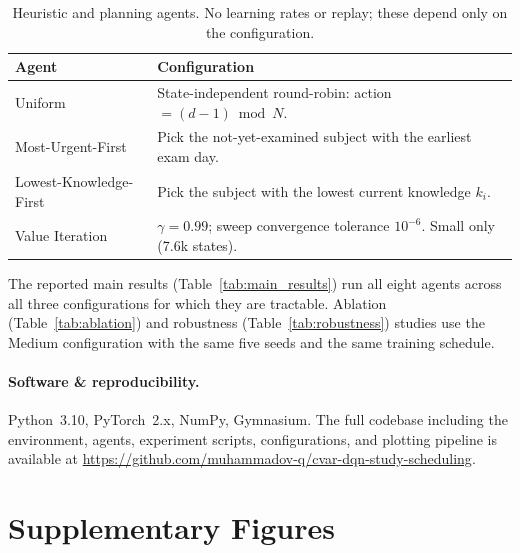 \documentclass[a4paper,11pt]{article}
\theoremstyle{definition}
\begin{document}
\begin{table}[H]
\centering
\caption{Heuristic and planning agents. No learning rates or replay; these depend only on the configuration.}
\label{tab:nonlearn_hp}
\small
\begin{tabular}{ll}
\toprule
Agent & Configuration \\
\midrule
Uniform                & State-independent round-robin: action $= (d - 1) \bmod N$. \\
Most-Urgent-First      & Pick the not-yet-examined subject with the earliest exam day. \\
Lowest-Knowledge-First & Pick the subject with the lowest current knowledge $k_i$. \\
Value Iteration        & $\gamma = 0.99$; sweep convergence tolerance $10^{-6}$. Small only (7.6k states). \\
\bottomrule
\end{tabular}
\end{table}

The reported main results (Table~\ref{tab:main_results}) run all eight agents across all three configurations for which they are tractable. Ablation (Table~\ref{tab:ablation}) and robustness (Table~\ref{tab:robustness}) studies use the Medium configuration with the same five seeds and the same training schedule.

\paragraph{Software \& reproducibility.} Python~3.10, PyTorch~2.x, NumPy, Gymnasium. The full codebase including the environment, agents, experiment scripts, configurations, and plotting pipeline is available at \url{https://github.com/muhammadov-q/cvar-dqn-study-scheduling}.

\section{Supplementary Figures}
\label{app:figures}
\end{document}
